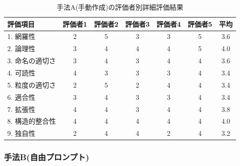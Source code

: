 \begin{table}[tp]
  \caption{手法A(手動作成)の評価者別詳細評価結果}
  \label{tb:detailed_evaluation_results_A}
  \centering
  \begin{tabular}{|l|c|c|c|c|c|c|}
    \hline
    \textbf{評価項目} & \textbf{評価者1} & \textbf{評価者2} & \textbf{評価者3} & \textbf{評価者4} & \textbf{評価者5} & \textbf{平均} \\
    \hline\hline
    1. 網羅性 & 2 & 5 & 3 & 3 & 5 & 3.6 \\
    \hline
    2. 論理性 & 3 & 4 & 4 & 4 & 5 & 4.0 \\
    \hline
    3. 命名の適切さ & 3 & 4 & 3 & 4 & 4 & 3.6 \\
    \hline
    4. 可読性 & 4 & 3 & 3 & 3 & 4 & 3.4 \\
    \hline
    5. 粒度の適切さ & 2 & 5 & 2 & 4 & 4 & 3.4 \\
    \hline
    6. 適合性 & 3 & 4 & 3 & 3 & 4 & 3.4 \\
    \hline
    7. 拡張性 & 4 & 4 & 3 & 4 & 4 & 3.8 \\
    \hline
    8. 構造的整合性 & 4 & 4 & 4 & 4 & 4 & 4.0 \\
    \hline
    9. 独自性 & 2 & 4 & 4 & 2 & 4 & 3.2 \\
    \hline
  \end{tabular}
\end{table}



\subsubsection{手法B(自由プロンプト)}

